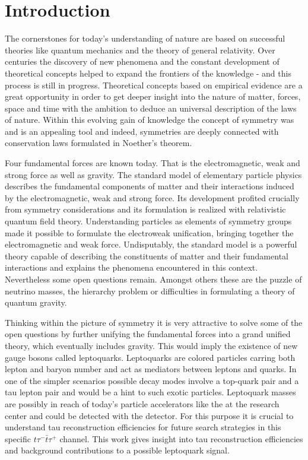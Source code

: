 \chapter{Introduction}
The cornerstones for today's understanding of nature are based on successful theories like quantum mechanics and the theory of general relativity. Over centuries the discovery of new phenomena and the constant development of theoretical concepts helped to expand the frontiers of the knowledge - and this process is still in progress. Theoretical concepts based on empirical evidence are a great opportunity in order to get deeper insight into the nature of matter, forces, space and time with the ambition to deduce an universal description of the laws of nature. Within this evolving gain of knowledge the concept of symmetry was and is an appealing tool and indeed, symmetries are deeply connected with conservation laws formulated in Noether's theorem.\par
Four fundamental forces are known today. That is the electromagnetic, weak and strong force as well as gravity. The standard model of elementary particle physics describes the fundamental components of matter and their interactions induced by the electromagnetic, weak and strong force. Its development profited crucially from symmetry considerations and its formulation is realized with relativistic quantum field theory. Understanding particles as elements of symmetry groups made it possible to formulate the electroweak unification, bringing together the electromagnetic and weak force. Undisputably, the standard model is a powerful theory capable of describing the constituents of matter and their fundamental interactions and explains the phenomena encountered in this context. Nevertheless some open questions remain. Amongst others these are the puzzle of neutrino masses, the hierarchy problem or difficulties in formulating a theory of quantum gravity.\par
Thinking within the picture of symmetry it is very attractive to solve some of the open questions by further unifying the fundamental forces into a grand unified theory, which eventually includes gravity. This would imply the existence of new gauge bosons called leptoquarks. Leptoquarks are colored particles carring both lepton and baryon number and act as mediators between leptons and quarks. In one of the simpler scenarios possible decay modes involve a top-quark pair and a tau lepton pair and would be a hint to such exotic particles. Leptoquark masses are possibly in reach of today's particle accelerators like the {\LHC} at the research center {\CERN} and could be detected with the {\ATLAS} detector. For this purpose it is crucial to understand tau reconstruction efficiencies for future search strategies in this specific $t\tau^-\bar{t}\tau^+$ channel. This work gives insight into tau reconstruction efficiencies and background contributions to a possible leptoquark signal.\par
